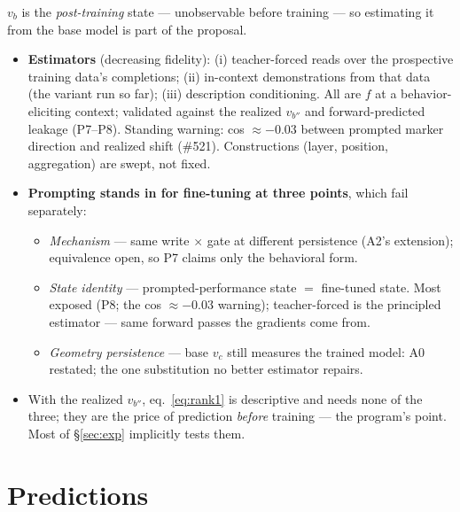 \documentclass[11pt]{article}
\newcommand{\vc}{v_c}
\newcommand{\vb}{v_b}
\begin{document}
$\vb$ is the \emph{post-training} state --- unobservable before training --- so estimating it from the base model is part of the proposal.
\begin{itemize}
\item \textbf{Estimators} (decreasing fidelity): (i) teacher-forced reads over the prospective training data's completions; (ii) in-context demonstrations from that data (the variant run so far); (iii) description conditioning. All are $f$ at a behavior-eliciting context; validated against the realized $v_{b''}$ and forward-predicted leakage (P7--P8). Standing warning: cos $\approx -0.03$ between prompted marker direction and realized shift (\#521). Constructions (layer, position, aggregation) are swept, not fixed.
\item \textbf{Prompting stands in for fine-tuning at three points}, which fail separately:
  \begin{itemize}
  \item \emph{Mechanism} --- same write $\times$ gate at different persistence (A2's extension); equivalence open, so P7 claims only the behavioral form.
  \item \emph{State identity} --- prompted-performance state $=$ fine-tuned state. Most exposed (P8; the cos $\approx -0.03$ warning); teacher-forced is the principled estimator --- same forward passes the gradients come from.
  \item \emph{Geometry persistence} --- base $\vc$ still measures the trained model: A0 restated; the one substitution no better estimator repairs.
  \end{itemize}
\item With the realized $v_{b''}$, eq.~\eqref{eq:rank1} is descriptive and needs none of the three; they are the price of prediction \emph{before} training --- the program's point. Most of \S\ref{sec:exp} implicitly tests them.
\end{itemize}

\section{Predictions}
\label{sec:pred}
\end{document}
